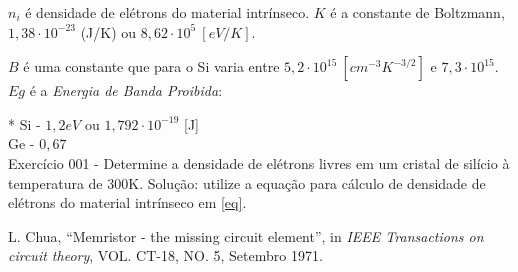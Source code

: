 \documentclass{PETeletrica}
\begin{document}
\begin{multicols}{2}
$n_i$ é densidade de elétrons do material intrínseco. $K$ é a constante de Boltzmann, $1,38\cdot 10^{-23}$ (J/K) ou $8,62\cdot 10^{5}\  [eV/K]$.

$B$ é uma constante que para o Si varia entre $5,2\cdot 10^15\  [cm^{-3}K^{-3/2}]$ e $7,3\cdot 10^{15}$.\\

$Eg$ é a \emph{Energia de Banda Proibida}:

* Si - $1,2eV$ ou $1,792\cdot 10^{-19}$ [J]\\
\indent*Ge - $0,67$\\


Exercício 001 - Determine a densidade de elétrons livres em um cristal de silício à temperatura de 300K.
Solução:  utilize a equação para cálculo de densidade de elétrons do material intrínseco em \ref{eq}.



\begin{thebibliography}{9}

    L. Chua,
    “Memristor - the missing circuit element”, 
    in \emph{IEEE Transactions on circuit theory}, VOL. CT-18, NO. 5, Setembro 1971.

\end{thebibliography}



\end{multicols}
\end{document}

